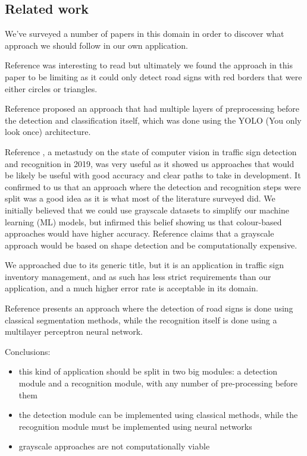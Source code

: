 \documentclass[conference]{IEEEtran}
\begin{document}

\subsection{Related work}
We've surveyed a number of papers in this domain in order to discover what approach we should follow in our
own application.

Reference \cite{4370763} was interesting to read but ultimately we found the approach in this paper
to be limiting as it could only detect road signs with red borders that were either circles or triangles.

Reference \cite{Karthika2022} proposed an approach that had multiple layers of preprocessing before
the detection and classification itself, which was done using the YOLO (You only look once) architecture.

Reference \cite{metastudy2019}, a metastudy on the state of computer vision in traffic sign detection and
recognition in 2019, was very useful as it showed us approaches that would be likely be useful
with good accuracy and clear paths to take in development. It confirmed to us that an approach where
the detection and recognition steps were split was a good idea as it is what most of the literature
surveyed did. We initially believed that we could use grayscale datasets to simplify our machine learning
(ML) models, but \cite{metastudy2019} infirmed this belief showing us that colour-based approaches would
have higher accuracy. Reference \cite{4290244} claims that a grayscale approach would be based on shape
detection and be computationally expensive.

We approached \cite{8709983} due to its generic title, but it is an application in traffic sign inventory
management, and as such has less strict requirements than our application, and a much higher error rate
is acceptable in its domain.

Reference \cite{6196571} presents an approach where the detection of road signs is done using classical
segmentation methods, while the recognition itself is done using a multilayer perceptron neural network.

Conclusions:
\begin{itemize}
    \item this kind of application should be split in two big modules: a detection module and a
    recognition module, with any number of pre-processing before them
    \item the detection module can be implemented using classical methods, while the recognition
    module must be implemented using neural networks
    \item grayscale approaches are not computationally viable
\end{itemize}
\end{document}
